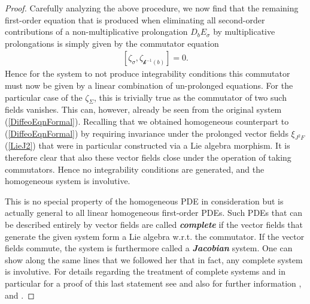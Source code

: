 \documentclass[a4paper,12pt, DIV=14, BCOR=5mm, twoside, headsepline, numbers=noenddot]{scrbook}
\begin{document}
\begin{proof}
Carefully analyzing the above procedure, we now find that the remaining first-order equation that is produced when eliminating all second-order contributions of a non-multiplicative prolongation $D_bE_{\sigma}$ by multiplicative prolongations is simply given by the commutator equation
\begin{align}
    \left [\zeta_{\sigma}, \zeta_{\mathcal{k}^{-1}(b)} \right] = 0.
\end{align}
Hence for the system to not produce integrability conditions this commutator must now be given by a linear combination of un-prolonged equations. For the particular case of the $\zeta_{\Sigma}$, this is trivially true as the commutator of two such fields vanishes. This can, however, already be seen from the original system (\ref{DiffeoEqnFormal}).
Recalling that we obtained homogeneous counterpart to (\ref{DiffeoEqnFormal}) by requiring invariance under the prolonged vector fields $\xi_{J^2F}$ (\ref{LieJ2}) that were in particular constructed via a Lie algebra morphism. It is therefore clear that also these vector fields close under the operation of taking commutators. Hence no integrability conditions are generated, and the homogeneous system is involutive.

This is no special property of the homogeneous PDE in consideration but is actually general to all linear homogeneous first-order PDEs. Such PDEs that can be described entirely by vector fields are called \textit{\textbf{complete}} if the vector fields that generate the given system form a Lie algebra w.r.t. the commutator. If the vector fields commute, the system is furthermore called a \textit{\textbf{Jacobian}} system. One can show along the same lines that we followed her that in fact, any complete system is involutive. For details regarding the treatment of complete systems and in particular for a proof of this last statement see \cite{seiler1994analysis} and also for further information \cite{Clebsch1866}, \cite{caratheodory1956variationsrechnung} and \cite{lie1970theorie}.


\end{proof}
\end{document}
